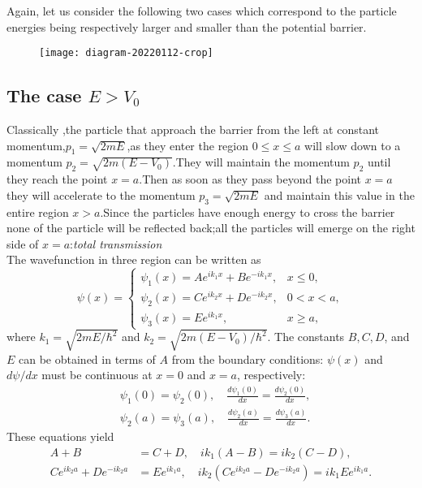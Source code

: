 Again, let us consider the following two cases which correspond to the particle energies being respectively larger and smaller than the potential barrier.\\
\begin{figure}[H]
	\centering
	\texttt{[image: diagram-20220112-crop]}
	\caption{}
	\label{}
\end{figure}
\subsection{The case $E>V_0$}
Classically ,the particle that approach the barrier from the left at constant momentum,$p_1=\sqrt{2mE}$,as they enter the region $0\leq x \leq a$ will slow down to a momentum $p_2=\sqrt{2m(E-V_0)}$.They will maintain the momentum $p_2$ until they reach the point $x=a$.Then as soon as they pass beyond the point $x=a$ they will accelerate to the momentum $p_3=\sqrt{2mE}$ and maintain this value in the entire region $x>a$.Since the particles have enough energy to cross the barrier none of the particle will be reflected back;all the particles will emerge on the right side of $x=a$:\textit{total transmission}\\
The wavefunction in three region can be written as 
$$\psi(x)= \begin{cases}\psi_{1}(x)=A e^{i k_{1} x}+B e^{-i k_{1} x}, & x \leq 0, \\ \psi_{2}(x)=C e^{i k_{2} x}+D e^{-i k_{2} x}, & 0<x<a, \\ \psi_{3}(x)=E e^{i k_{1} x}, & x \geq a,\end{cases}$$
where $k_{1}=\sqrt{2 m E / \hbar^{2}}$ and $k_{2}=\sqrt{2 m\left(E-V_{0}\right) / \hbar^{2}}$. The constants $B, C, D$, and $E$ can be obtained in terms of $A$ from the boundary conditions: $\psi(x)$ and $d \psi / d x$ must be continuous at $x=0$ and $x=a$, respectively:
$$\begin{aligned}
	&\psi_{1}(0)=\psi_{2}(0), \quad \frac{d \psi_{1}(0)}{d x}=\frac{d \psi_{2}(0)}{d x}, \\
	&\psi_{2}(a)=\psi_{3}(a), \quad \frac{d \psi_{2}(a)}{d x}=\frac{d \psi_{3}(a)}{d x} .
\end{aligned}$$
These equations yield
$$
\begin{aligned}
A+B &=C+D, \quad i k_{1}(A-B)=i k_{2}(C-D), \\
C e^{i k_{2} a}+D e^{-i k_{2} a} &=E e^{i k_{1} a}, \quad i k_{2}\left(C e^{i k_{2} a}-D e^{-i k_{2} a}\right)=i k_{1} E e^{i k_{1} a} .
\end{aligned}
$$
